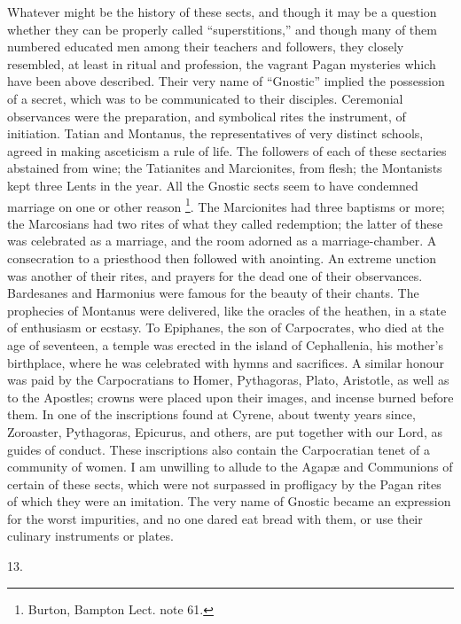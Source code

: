 Whatever might be the history of these sects, and
though it may be a question whether they can be properly
called ``superstitions,'' and though many of them
numbered educated men among their teachers and followers,
they closely resembled, at least in ritual and
profession, the vagrant Pagan mysteries which have been
above described. Their very name of ``Gnostic''
implied the possession of a secret, which was to be
communicated to their disciples. Ceremonial observances
were the preparation, and symbolical rites the
instrument, of initiation. Tatian and Montanus, the
representatives of very distinct schools, agreed in
making asceticism a rule of life. The followers of each
of these sectaries abstained from wine; the Tatianites
and Marcionites, from flesh; the Montanists kept three
Lents in the year. All the Gnostic sects seem to have
condemned marriage on one or other reason \footnote{Burton, Bampton Lect. note
61.}. The
Marcionites had three baptisms or more; the Marcosians
had two rites of what they called redemption; the latter
of these was celebrated as a marriage, and the room
adorned as a marriage-chamber. A consecration to a
priesthood then followed with anointing. An extreme
unction was another of their rites, and prayers for the
dead one of their observances. Bardesanes and Harmonius
were famous for the beauty of their chants. The
prophecies of Montanus were delivered, like the oracles
of the heathen, in a state of enthusiasm or ecstasy. To
Epiphanes, the son of Carpocrates, who died at the age of
seventeen, a temple was erected in the island of
Cephallenia, his mother's birthplace, where he was
celebrated with hymns and sacrifices. A similar honour
was paid by the Carpocratians to Homer, Pythagoras,
Plato, Aristotle, as well as to the Apostles; crowns were
placed upon their images, and incense burned before them.
In one of the inscriptions found at Cyrene, about twenty
years since, Zoroaster, Pythagoras, Epicurus, and others,
are put together with our Lord, as guides of conduct.
These inscriptions also contain the Carpocratian tenet of
a community of women. I am unwilling to allude to the Agapæ and Communions of certain of these sects, which
were not surpassed in profligacy by the Pagan rites of
which they were an imitation. The very name of Gnostic
became an expression for the worst impurities, and no one
dared eat bread with them, or use their culinary
instruments or plates.

13.

